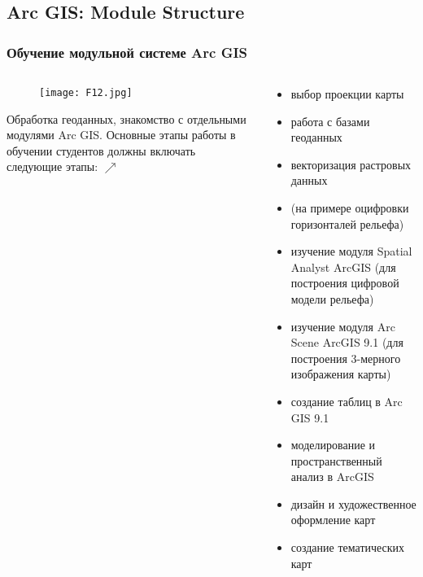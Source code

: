 \documentclass[pdflatex,compress,8pt,
	xcolor={dvipsnames,dvipsnames,svgnames,x11names,table},
	hyperref={	 
	pdfauthor={Lemenkova Polina}, 
	pdfsubject={Preentation}, 
	pdfcreator={Lemenkova Polina}, 
	pdfproducer={Lemenkova Polina}, 
	colorlinks=true,
	linkcolor=Red3, 
	citecolor=NavyBlue, 
	urlcolor = NavyBlue, 
	breaklinks = true}]{beamer}
\begin{document}
\subsection{Arc GIS: Module Structure}
\begin{frame}\frametitle{Обучение модульной системе Arc GIS}

	\begin{minipage}[0.4\textheight]{\textwidth}
		\begin{columns}[T]
			\begin{column}{0.5\textwidth}		
				\begin{figure}[H]
					\centering
					\texttt{[image: F12.jpg]}
				\end{figure}
			Обработка геоданных, знакомство с отдельными модулями Arc GIS. Основные этапы работы в обучении студентов должны включать следующие этапы: $\nearrow$
			\end{column}
			\begin{column}{0.5\textwidth}
\begin{alertblock}{}

\begin{itemize}
	\item выбор проекции карты
	\item работа с базами геоданных
	\item векторизация растровых данных
	\item (на примере оцифровки горизонталей рельефа) 
	\item изучение модуля Spatial Analyst ArcGIS (для построения цифровой модели рельефа)
	\item изучение модуля Arc Scene ArcGIS 9.1 (для построения 3-мерного изображения карты)
	\item создание таблиц в Arc GIS 9.1 
	\item моделирование и пространственный анализ в ArcGIS
	\item дизайн и художественное оформление карт
	\item создание тематических карт
\end{itemize}

\end{alertblock}
			\end{column}
		\end{columns}
	\end{minipage}
\end{frame}
\end{document}

